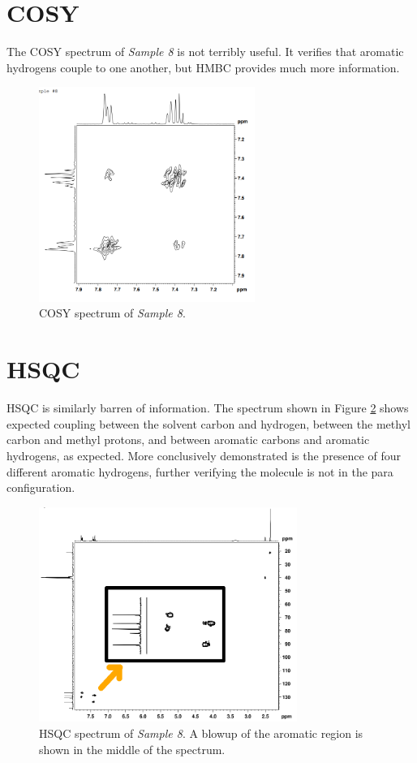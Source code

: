 \documentclass[8.5pt,twoside,twocolumn]{article}
\begin{document}
\section{COSY}
The COSY spectrum of \textit{Sample 8} is not terribly useful. It verifies that aromatic hydrogens couple to one another, but HMBC provides much more information.

\begin{figure}[h]
\centering
  \includegraphics[height=7cm]{figures/cosy.png}
  \caption{COSY spectrum of \textit{Sample 8}.}
  \label{fig:COSY}
\end{figure}

\section{HSQC}
HSQC is similarly barren of information. The spectrum shown in Figure \ref{fig:HSQC} shows expected coupling between the solvent carbon and hydrogen, between the methyl carbon and methyl protons, and between aromatic carbons and aromatic hydrogens, as expected. More conclusively demonstrated is the presence of four different aromatic hydrogens, further verifying the molecule is not in the para configuration.\\

\begin{figure}[h]
\centering
  \includegraphics[height=7cm]{figures/HSQC.png}
  \caption{HSQC spectrum of \textit{Sample 8}. A blowup of the aromatic region is shown in the middle of the spectrum.}
  \label{fig:HSQC}
\end{figure}
\end{document}
